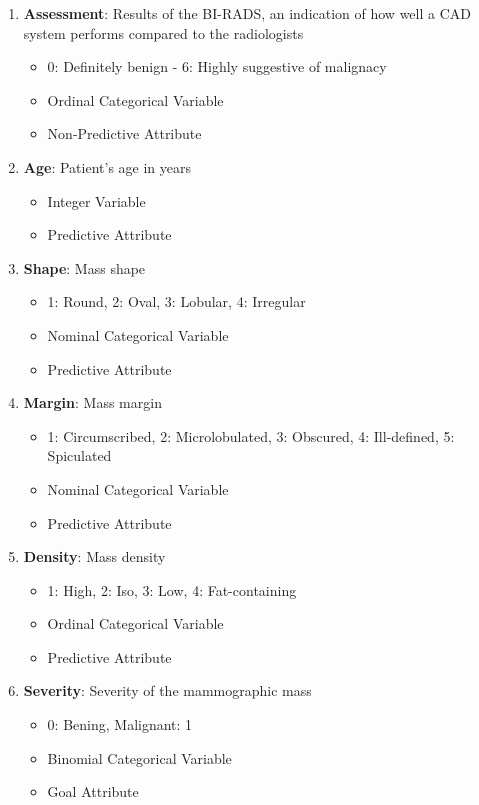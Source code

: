 \documentclass[a4paper,12pt]{article}\usepackage[]{graphicx}\usepackage[]{color}
\begin{document}
\begin{enumerate}

\item \textbf{Assessment}: Results of the BI-RADS, an indication of how well a CAD system performs compared to the radiologists
\begin{itemize}
  \item 0: Definitely benign - 6: Highly suggestive of malignacy
  \item Ordinal Categorical Variable
  \item Non-Predictive Attribute
\end{itemize}

\item \textbf{Age}: Patient's age in years
\begin{itemize}
  \item Integer Variable
  \item Predictive Attribute
\end{itemize}

\item \textbf{Shape}: Mass shape
\begin{itemize}
  \item 1: Round, 2: Oval, 3: Lobular, 4: Irregular
  \item Nominal Categorical Variable
  \item Predictive Attribute
\end{itemize}

\item \textbf{Margin}: Mass margin
\begin{itemize}
  \item 1: Circumscribed, 2: Microlobulated, 3: Obscured, 4: Ill-defined, 5: Spiculated
  \item Nominal Categorical Variable
  \item Predictive Attribute
\end{itemize}

\item \textbf{Density}: Mass density
\begin{itemize}
  \item 1: High, 2: Iso, 3: Low, 4: Fat-containing
  \item Ordinal Categorical Variable
  \item Predictive Attribute
\end{itemize}

\item \textbf{Severity}: Severity of the mammographic mass
\begin{itemize}
  \item 0: Bening, Malignant: 1
  \item Binomial Categorical Variable
  \item Goal Attribute
\end{itemize}
\end{enumerate}
\end{document}
